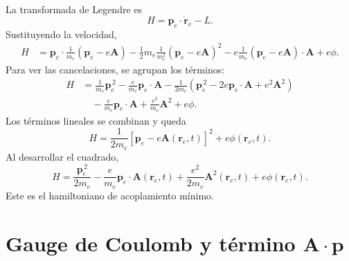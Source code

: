 \documentclass[11pt]{article}
\newcommand{\vb}[1]{\mathbf{#1}}
\begin{document}
La transformada de Legendre es
\begin{equation}
  H
  =
  \vb p_e\cdot\dot{\vb r}_e-L.
\end{equation}
Sustituyendo la velocidad,
\begin{align}
  H
  &=
  \vb p_e\cdot
  \frac{1}{m_e}\left(\vb p_e-e\vb A\right)
  -
  \frac{1}{2}m_e
  \frac{1}{m_e^2}
  \left(\vb p_e-e\vb A\right)^2
  -
  e
  \frac{1}{m_e}
  \left(\vb p_e-e\vb A\right)\cdot\vb A
  +e\phi .
\end{align}
Para ver las cancelaciones, se agrupan los t\'erminos:
\begin{align}
  H
  &=
  \frac{1}{m_e}\vb p_e^{\,2}
  -\frac{e}{m_e}\vb p_e\cdot\vb A
  -\frac{1}{2m_e}
  \left(
    \vb p_e^{\,2}
    -2e\vb p_e\cdot\vb A
    +e^2\vb A^2
  \right)                                                                     \\
  &\quad
  -\frac{e}{m_e}\vb p_e\cdot\vb A
  +\frac{e^2}{m_e}\vb A^2
  +e\phi .
\end{align}
Los t\'erminos lineales se combinan y queda
\begin{equation}
  H
  =
  \frac{1}{2m_e}
  \left[
    \vb p_e-e\vb A(\vb r_e,t)
  \right]^2
  +e\phi(\vb r_e,t).
\end{equation}
Al desarrollar el cuadrado,
\begin{equation}
  H
  =
  \frac{\vb p_e^{\,2}}{2m_e}
  -
  \frac{e}{m_e}\vb p_e\cdot\vb A(\vb r_e,t)
  +
  \frac{e^2}{2m_e}\vb A^2(\vb r_e,t)
  +
  e\phi(\vb r_e,t).
\end{equation}
Este es el hamiltoniano de acoplamiento m\'inimo.

\section{Gauge de Coulomb y t\'ermino \texorpdfstring{\(\vb A\cdot\vb p\)}{A.p}}
\end{document}
